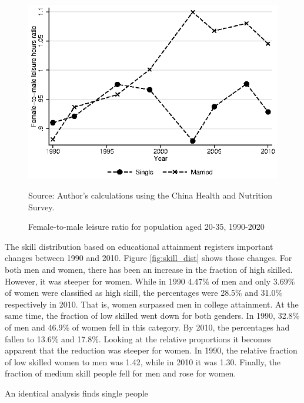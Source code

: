 \documentclass[12pt]{article}
\newcommand{\source}[1]{\caption*{Source: {#1}} }
\begin{document}
\begin{figure}[hp]
	\centering
	\caption{Female-to-male leisure ratio for population aged 20-35, 1990-2020}
	\includegraphics[width=.6\textwidth]{leisure_ratio_all}
	\label{fig:leisure_ratio}
	\source{Author's calculations using the China Health and Nutrition Survey.}
\end{figure}

The skill distribution based on educational attainment registers important changes between 1990 and 2010. Figure \ref{fig:skill_dist} shows those changes. For both men and women, there has been an increase in the fraction of high skilled. However, it was steeper for women. While in 1990 4.47\% of men and only 3.69\% of women were classified as high skill, the percentages were 28.5\% and 31.0\% respectively in 2010. That is, women surpassed men in college attainment. At the same time, the fraction of low skilled went down for both genders. In 1990, 32.8\% of men and 46.9\% of women fell in this category. By 2010, the percentages had fallen to 13.6\% and 17.8\%. Looking at the relative proportions it becomes apparent that the reduction was steeper for women. In 1990, the relative fraction of low skilled women to men was 1.42, while in 2010 it was 1.30. Finally, the fraction of medium skill people fell for men and rose for women. 

An identical analysis finds single people
\end{document}
